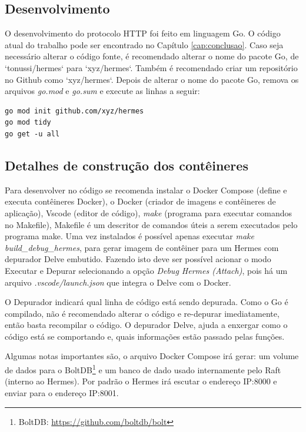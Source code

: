 \subsection{Desenvolvimento}

O desenvolvimento do protocolo \gls{HTTP} foi feito em linguagem Go. O código atual do trabalho pode ser encontrado no Capítulo \ref{cap:conclusao}. Caso seja necessário alterar o código fonte, é recomendado alterar o nome do pacote Go, de `tonussi/hermes` para `xyz/hermes`. Também é recomendado criar um repositório no Github como `xyz/hermes`. Depois de alterar o nome do pacote Go, remova os arquivos \textit{go.mod} e \textit{go.sum} e execute as linhas a seguir:

\begin{verbatim}
go mod init github.com/xyz/hermes
go mod tidy
go get -u all
\end{verbatim}

\subsection{Detalhes de construção dos contêineres}

Para desenvolver no código se recomenda instalar o Docker Compose (define e executa contêineres Docker), o Docker (criador de imagens e contêineres de aplicação), Vscode (editor de código), \textit{make} (programa para executar comandos no Makefile), Makefile é um descritor de comandos úteis a serem executados pelo programa make. Uma vez instalados é possível apenas executar \textit{make build\_debug\_hermes}, para gerar imagem de contêiner para um Hermes com depurador Delve embutido. Fazendo isto deve ser possível acionar o modo Executar e Depurar selecionando a opção \textit{Debug Hermes (Attach)}, pois há um arquivo \textit{.vscode/launch.json} que integra o Delve com o Docker.

O Depurador indicará qual linha de código está sendo depurada. Como o Go é compilado, não é recomendado alterar o código e re-depurar imediatamente, então basta recompilar o código. O depurador Delve, ajuda a enxergar como o código está se comportando e, quais informações estão passado pelas funções.

Algumas notas importantes são, o arquivo Docker Compose irá gerar: um volume de dados para o BoltDB\footnote{BoltDB: \url{https://github.com/boltdb/bolt}} e um banco de dado usado internamente pelo Raft (interno ao Hermes). Por padrão o Hermes irá escutar o endereço \gls{IP}:8000 e enviar para o endereço \gls{IP}:8001.

